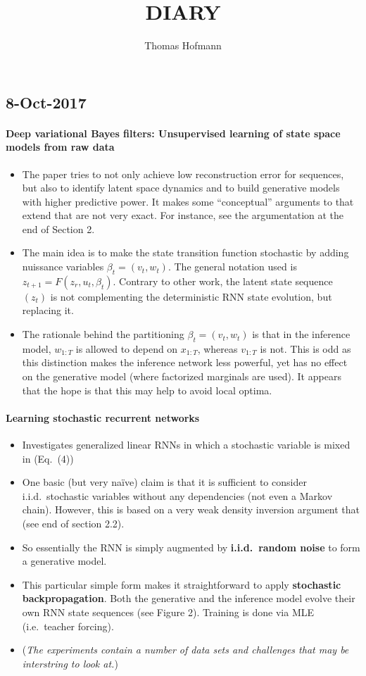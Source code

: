 \documentclass[a4paper,10pt]{article}
\title{DIARY}
\author{Thomas Hofmann}
\begin{document}
\subsection*{8-Oct-2017}

\paragraph*{Deep variational Bayes filters: Unsupervised learning of state space models from raw data \cite{karl2016deep}}
\begin{itemize}
\setlength{\itemsep}{0.5mm}
\item The paper tries to not only achieve low reconstruction error for sequences, but also to identify latent space dynamics and to build generative models with higher predictive power. It makes some ``conceptual'' arguments to that extend that are not very exact. For instance, see the argumentation at the end of Section 2. 
\item The main idea is to make the state transition function stochastic by adding nuissance variables $\beta_t=(v_t,w_t)$. The general notation used is $z_{t+1} = F(z_r, u_t, \beta_t)$. Contrary to other work, the latent state sequence $(z_t)$ is not complementing the deterministic RNN state evolution, but replacing it. 
\item The rationale behind the partitioning $\beta_t=(v_t,w_t)$ is that in the inference model, $w_{1:T}$ is allowed to depend on $x_{1:T}$, whereas $v_{1:T}$ is not. This is odd as this distinction makes the inference network less powerful, yet has no effect on the generative model (where factorized marginals are used). It appears that the hope is that this may help to avoid local optima. 
\end{itemize}

\paragraph*{Learning stochastic recurrent networks \cite{bayer2014learning}}
\begin{itemize}
\setlength{\itemsep}{0.5mm}
\item Investigates generalized linear RNNs in which a stochastic variable is mixed in (Eq.~(4))
\item One basic (but very na\"ive) claim is that it is sufficient to consider i.i.d.~stochastic variables without any dependencies (not even a Markov chain). However, this is based on a very weak density inversion argument that (see end of section 2.2). 
\item So essentially the RNN is simply augmented by \textbf{i.i.d.~random noise} to form a generative model. \item This particular simple form makes it straightforward to apply \textbf{stochastic backpropagation}.  Both the generative and the inference model evolve their own RNN state sequences (see Figure 2). Training is done via MLE (i.e.~teacher forcing). 
\item (\textit{The experiments contain a number of data sets and challenges that may be interstring to look at.})
\end{itemize}
\end{document}
